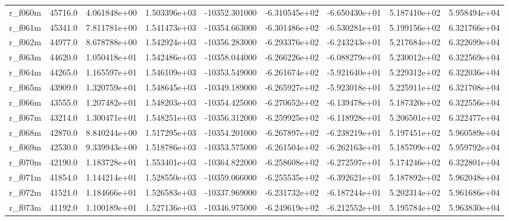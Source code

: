 \documentclass[10pt]{article}
\begin{document}
\begin{landscape}
\begin{longtable}{lrrrrrrrr}
r\_f060m                 &   45716.0 &  4.061848e+00 &  1.503396e+03 & -10352.301000 & -6.310545e+02 & -6.650430e+01 &  5.187410e+02 &  5.958494e+04 \\
r\_f061m                 &   45341.0 &  7.811781e+00 &  1.541473e+03 & -10354.663000 & -6.301486e+02 & -6.530281e+01 &  5.199156e+02 &  6.321766e+04 \\
r\_f062m                 &   44977.0 &  8.678788e+00 &  1.542924e+03 & -10356.283000 & -6.293376e+02 & -6.243243e+01 &  5.217684e+02 &  6.322699e+04 \\
r\_f063m                 &   44620.0 &  1.050418e+01 &  1.542486e+03 & -10358.044000 & -6.266226e+02 & -6.088279e+01 &  5.230012e+02 &  6.322569e+04 \\
r\_f064m                 &   44265.0 &  1.165597e+01 &  1.546109e+03 & -10353.549000 & -6.261674e+02 & -5.921640e+01 &  5.229312e+02 &  6.322036e+04 \\
r\_f065m                 &   43909.0 &  1.320759e+01 &  1.548645e+03 & -10349.189000 & -6.265927e+02 & -5.923018e+01 &  5.225911e+02 &  6.321708e+04 \\
r\_f066m                 &   43555.0 &  1.207482e+01 &  1.548203e+03 & -10354.425000 & -6.270652e+02 & -6.139478e+01 &  5.187320e+02 &  6.322556e+04 \\
r\_f067m                 &   43214.0 &  1.300471e+01 &  1.548251e+03 & -10356.312000 & -6.259925e+02 & -6.118928e+01 &  5.206501e+02 &  6.322477e+04 \\
r\_f068m                 &   42870.0 &  8.840244e+00 &  1.517295e+03 & -10354.201000 & -6.267897e+02 & -6.238219e+01 &  5.197451e+02 &  5.960589e+04 \\
r\_f069m                 &   42530.0 &  9.339943e+00 &  1.518786e+03 & -10353.575000 & -6.261504e+02 & -6.262163e+01 &  5.185709e+02 &  5.959792e+04 \\
r\_f070m                 &   42190.0 &  1.183728e+01 &  1.553401e+03 & -10364.822000 & -6.258608e+02 & -6.272597e+01 &  5.174246e+02 &  6.322801e+04 \\
r\_f071m                 &   41854.0 &  1.144214e+01 &  1.528550e+03 & -10359.066000 & -6.255535e+02 & -6.392621e+01 &  5.187892e+02 &  5.962048e+04 \\
r\_f072m                 &   41521.0 &  1.184666e+01 &  1.526583e+03 & -10337.969000 & -6.231732e+02 & -6.187244e+01 &  5.202314e+02 &  5.961686e+04 \\
r\_f073m                 &   41192.0 &  1.100189e+01 &  1.527136e+03 & -10346.975000 & -6.249619e+02 & -6.212552e+01 &  5.195784e+02 &  5.963830e+04 \\

\end{longtable}
\end{landscape}
\end{document}
